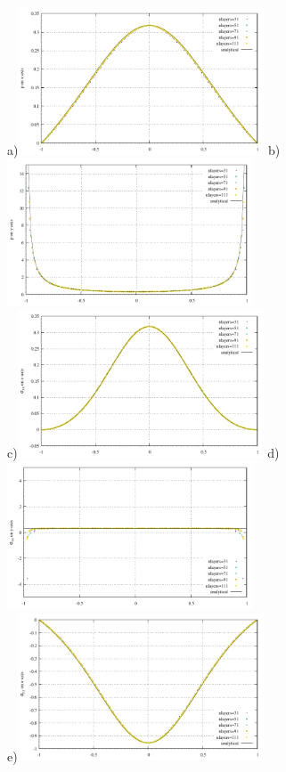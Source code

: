 \newpage
\begin{center}
a)\includegraphics[width=7.3cm]{python_codes/fieldstone_58/experiment1/press_xaxis.pdf}
b)\includegraphics[width=7.3cm]{python_codes/fieldstone_58/experiment1/press_yaxis.pdf}\\
c)\includegraphics[width=7.3cm]{python_codes/fieldstone_58/experiment1/sigmaxx_xaxis.pdf}
d)\includegraphics[width=7.3cm]{python_codes/fieldstone_58/experiment1/sigmaxx_yaxis.pdf}\\
e)\includegraphics[width=7.3cm]{python_codes/fieldstone_58/experiment1/sigmayy_xaxis.pdf}

\end{center}
